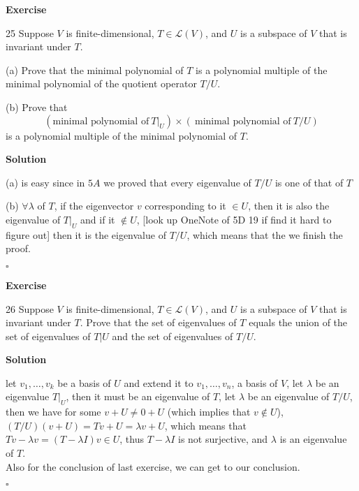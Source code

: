 \documentclass{article}
\newenvironment{exercise}{%
{\textbf{Exercise\\}
    }
}{
}
\newenvironment{solution}{%
{
    \textbf{Solution\\}
    }
}{
  \hfill $\square$ 
  \par\bigskip 
}
\begin{document}
\begin{CJK}{UTF8}{gkai}

\begin{exercise}
    25 Suppose $V$ is finite-dimensional, $T \in \mathcal{L}(V)$, and $U$ is a subspace of $V$ that is invariant under $T$.

    (a) Prove that the minimal polynomial of $T$ is a polynomial multiple of the minimal polynomial of the quotient operator $T/U$.

    (b) Prove that \[(\text{minimal polynomial of}~ T|_U) \times (~\text{minimal polynomial of}~ T/U)\] is a polynomial multiple of the minimal polynomial of $T$.

\end{exercise}

\begin{solution}
    (a) is easy since in $5A$ we proved that every eigenvalue of $T/U$ is one of that of $T$

    (b) $\forall \lambda$ of $T$, if the eigenvector $v$ corresponding to it $\in U$, then it is also the eigenvalue of $T|_U$ and if it $\notin U$, [look up OneNote of 5D 19 if find it hard to figure out] then it is the eigenvalue of $T/U$, which means that the we finish the proof.
    
\end{solution}

\begin{exercise}
    26 Suppose $V$ is finite-dimensional, $T \in \mathcal{L}(V)$, and $U$ is a subspace of $V$ that is invariant under $T$. Prove that the set of eigenvalues of $T$ equals the union of the set of eigenvalues of $T|U$ and the set of eigenvalues of $T/U$.
\end{exercise}

\begin{solution}
    let $v_1,\ldots,v_k$ be a basis of $U$ and extend it to $v_1,\ldots,v_n$, a basis of $V$, let $\lambda$ be an eigenvalue $T|_U$, then it must be an eigenvalue of $T$, let $\lambda$ be an eigenvalue of $T/U$, then we have for some $v + U \neq 0+ U$ (which implies that $v \notin U$), $(T/U)(v + U) = Tv + U = \lambda v + U$, which means that $Tv - \lambda v = (T - \lambda I) v \in U$, thus $T - \lambda I$ is not surjective, and $\lambda$ is an eigenvalue of $T$.\\
    
    Also for the conclusion of last exercise, we can get to our conclusion.
\end{solution}


\end{CJK}
\end{document}
